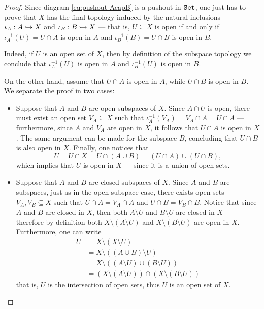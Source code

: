 \begin{proof}
    Since diagram \cref{eq:pushout-AcapB} is a pushout in \({\texttt{Set}}\), one just has to
    prove that \(X\) has the final topology induced by the natural inclusions
    \(\iota_A: A \hookrightarrow X\) and \(\iota_B: B \hookrightarrow X\) --- that is, \(U \subseteq X\)
    is open if and only if \(\iota_A^{-1}(U) = U \cap A\) is open in \(A\) and
    \(\iota_B^{-1}(B) = U \cap B\) is open in \(B\).

    Indeed, if \(U\) is an open set of \(X\), then by definition of the subspace
    topology we conclude that \(\iota_A^{-1}(U)\) is open in \(A\) and
    \(\iota_B^{-1}(U)\) is open in \(B\).

    On the other hand, assume that \(U \cap A\) is open in \(A\), while \(U \cap B\)
    is open in \(B\). We separate the proof in two cases:
    \begin{itemize}\setlength\itemsep{0em}
        \item Suppose that \(A\) and \(B\) are open subspaces of \(X\). Since \(A \cap
              U\) is open, there must exist an open set \(V_A \subseteq X\) such that
              \(\iota_A^{-1}(V_A) = V_A \cap A = U \cap A\) --- furthermore, since \(A\) and
              \(V_A\) are open in \(X\), it follows that \(U \cap A\) is open in \(X\). The
              same argument can be made for the subspace \(B\), concluding that \(U \cap B\)
              is also open in \(X\). Finally, one notices that
              \[
                  U = U \cap X = U \cap (A \cup B) = (U \cap A) \cup (U \cap B),
              \]
              which implies that \(U\) is open in \(X\) --- since it is a union of open
              sets.

        \item Suppose that \(A\) and \(B\) are closed subspaces of \(X\). Since \(A\)
              and \(B\) are subspaces, just as in the open subspace case, there exists open
              sets \(V_A, V_B \subseteq X\) such that \(U \cap A = V_A \cap A\) and
              \(U \cap B = V_B \cap B\). Notice that since \(A\) and \(B\) are closed in
              \(X\), then both \(A \setminus U\) and \(B \setminus U\) are closed in \(X\)
              --- therefore by definition both \(X \setminus (A \setminus U)\) and \(X
              \setminus (B \setminus U)\) are open in \(X\). Furthermore, one can write
              \begin{align*}
                  U & = X \setminus (X \setminus U)                                      \\
                    & = X \setminus ((A \cup B) \setminus U)                             \\
                    & = X \setminus ((A \setminus U) \cup (B \setminus U))               \\
                    & = (X \setminus (A \setminus U)) \cap (X \setminus (B \setminus U))
              \end{align*}
              that is, \(U\) is the intersection of open sets, thus \(U\) is an open set of
              \(X\).
    \end{itemize}
\end{proof}

